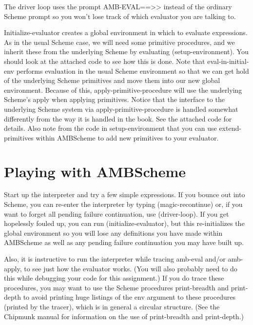 The driver loop uses the prompt {\cf AMB-EVAL==>>} instead of the
ordinary {\sc Scheme} prompt so you won't lose track of which evaluator you are
talking to.

{\cf Initialize-evaluator} creates a global environment in which
to evaluate expressions.  As in the usual {\sc Scheme} case, we will need
some primitive procedures, and we inherit these from the underlying
{\sc Scheme} by evaluating {\cf (setup-environment)}.  You should look at
the attached code to see how this is done.  Note that {\cf
eval-in-initial-env} performs evaluation in the usual {\sc Scheme}
environment so that we can get hold of the underlying {\sc Scheme}
primitives and move them into our new global environment.
Because of this, {\cf apply-primitive-procedure} will use the
underlying {\sc Scheme}'s {\cf apply} when applying primitives.  Notice that
the interface to the underlying {\sc Scheme} system via {\cf
apply-primitive-procedure} is handled somewhat differently from the
way it is handled in the book.  See the attached code for details.
Also note from the code in {\cf setup-environment} that you can use {\cf
extend-primitives} within {\sc AMBScheme} to add new primitives to your
evaluator.

\section{Playing with {\sc AMBScheme}}

Start up the interpreter and try a few simple expressions.  If you
bounce out into {\sc Scheme}, you can re-enter the interpreter by typing
{\cf (magic-recontinue)} or, if you want to forget all pending failure
continuation, use {\cf (driver-loop)}.  If you get hopelessly fouled
up, you can run {\cf (initialize-evaluator)}, but this re-initializes the global
environment so you will lose any definitions you have made within {\sc
AMBScheme} as well as any pending failure continuation you may have built up.

Also, it is instructive to run the interpreter while tracing {\cf
amb-eval} and/or {\cf amb-apply}, to see just how the evaluator
works.  (You will also probably need to do this while debugging your
code for this assignment.)  If you do trace these procedures, you may
want to use the {\sc Scheme} procedures {\cf print-breadth} and {\cf
print-depth} to avoid printing huge listings of the {\cf env} argument
to these procedures (printed by the tracer), which is in general a
circular structure.  (See the Chipmunk manual for information on the
use of {\cf print-breadth} and {\cf print-depth}.)

